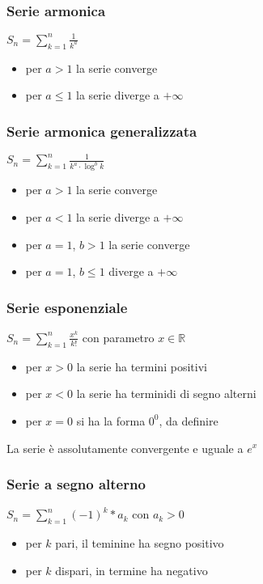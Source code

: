 \documentclass[a4paper]{article}
\begin{document}
\subsubsection*{Serie armonica}
\(\displaystyle S_n = \sum_{k = 1}^{n} \frac{1}{k^a}\)
\begin{itemize}
	\item per \(a > 1\) la serie converge
	\item per \(a \leq 1\) la serie diverge a \(+ \infty\)
\end{itemize}

\subsubsection*{Serie armonica generalizzata}
\(\displaystyle S_n = \sum_{k = 1}^{n} \frac{1}{k^a \cdot \log^b k}\)
\begin{itemize}
	\item per \(a > 1\) la serie converge
	\item per \(a < 1\) la serie diverge a \(+ \infty\)
	\item per \(a = 1\), \(b > 1\) la serie converge
	\item per \(a = 1\), \(b \leq 1\) diverge a \(+ \infty\)
\end{itemize}

\subsubsection*{Serie esponenziale}
\(\displaystyle S_n = \sum_{k = 1}^{n} \frac{x^k}{k!}\) con parametro \(x \in \mathbb{R}\)
\begin{itemize}
	\item per \(x > 0\) la serie ha termini positivi
	\item per \(x < 0\) la serie ha terminidi di segno alterni
	\item per \(x = 0\) si ha la forma \(0^0\), da definire
\end{itemize}
La serie è assolutamente convergente e uguale a \(e^x\)

\subsubsection*{Serie a segno alterno}
\(\displaystyle S_n = \sum_{k = 1}^{n} (-1)^k * a_k\) con \(a_k > 0\)
\begin{itemize}
	\item per \(k\) pari, il teminine ha segno positivo
	\item per \(k\) dispari, in termine ha negativo
\end{itemize}
\end{document}
